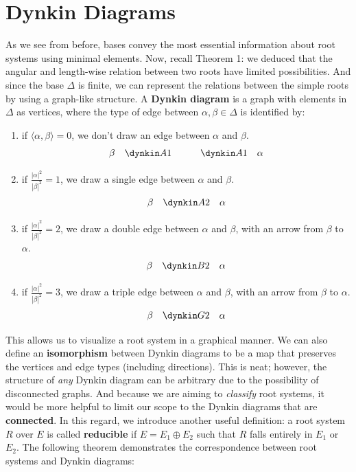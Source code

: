 \documentclass{article}
\theoremstyle{definition}
\begin{document}
\section{Dynkin Diagrams}
\quad As we see from before, bases convey the most essential information about root systems using minimal elements. Now, recall Theorem 1: we deduced that the angular and length-wise relation between two roots have limited possibilities. And since the base $\Delta$ is finite, we can represent the relations between the simple roots by using a graph-like structure. A \textbf{Dynkin diagram} is a graph with elements in $\Delta$ as vertices, where the type of edge between $\alpha,\beta\in\Delta$ is identified by:  
\begin{enumerate}
    \item if $\langle\alpha,\beta\rangle=0$, we don't draw an edge between $\alpha$ and $\beta$. 
        $$\beta \quad \dynkin A1 \quad \quad \quad \dynkin A1 \quad \alpha$$
    \item if $\frac{|\alpha|^2}{|\beta|^2}=1$, we draw a single edge between $\alpha$ and $\beta$. 
    $$\beta \quad \dynkin A2 \quad \alpha$$
    \item if $\frac{|\alpha|^2}{|\beta|^2}=2$, we draw a double edge between $\alpha$ and $\beta$, with an arrow from $\beta$ to $\alpha$. 
    $$\beta \quad \dynkin B2 \quad \alpha$$
    \item if $\frac{|\alpha|^2}{|\beta|^2}=3$, we draw a triple edge between $\alpha$ and $\beta$, with an arrow from $\beta$ to $\alpha$. 
    $$\beta \quad \dynkin G2 \quad \alpha$$
\end{enumerate}
This allows us to visualize a root system in a graphical manner. We can also define an \textbf{isomorphism} between Dynkin diagrams to be a map that preserves the vertices and edge types (including directions). This is neat; however, the structure of \textit{any} Dynkin diagram can be arbitrary due to the possibility of disconnected graphs. And because we are aiming to \textit{classify} root systems, it would be more helpful to limit our scope to the Dynkin diagrams that are \textbf{connected}. In this regard, we introduce another useful definition: a root system $R$ over $E$ is called \textbf{reducible} if $E=E_1\oplus E_2$ such that $R$ falls entirely in $E_1$ or $E_2$. The following theorem demonstrates the correspondence between root systems and Dynkin diagrams: 
\end{document}
